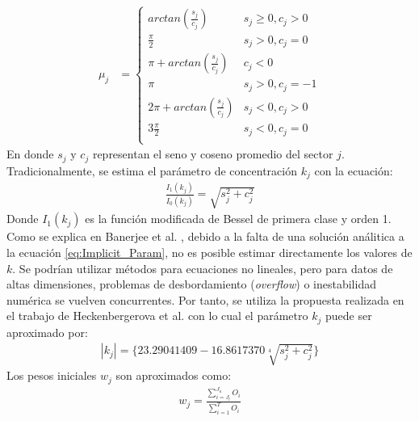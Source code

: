 \begin{align}\label{eq:Prevailing_Param}
    \mu_j &= 
        \left\{
            \begin{array}{ll}
                arctan(\frac{s_j}{c_j})  & s_j \geq 0, c_j > 0\\
                \frac{\pi}{2} & s_j > 0, c_j = 0\\
                \pi + arctan(\frac{s_j}{c_j}) & c_j < 0\\
                \pi & s_j > 0, c_j = -1\\
                2\pi + arctan(\frac{s_j}{c_j}) & s_j < 0, c_j > 0\\
                3\frac{\pi}{2} & s_j < 0, c_j = 0\\
            \end{array}
        \right.
\end{align}
En donde $s_j$ y $c_j$ representan el seno y coseno promedio del sector $j$.\\
Tradicionalmente, se estima el parámetro de concentración $k_j$ con la ecuación:
\begin{align}\label{eq:Implicit_Param}
    \frac{I_1(k_j)}{I_0(k_j)} = \sqrt{s_j^2 + c_j^2}
\end{align}
Donde $I_1(k_j)$ es la función modificada de Bessel de primera clase y orden 1.
 Como se explica en Banerjee et al. \cite{Banerjee05}, debido a la falta de una solución análitica a la ecuación \ref{eq:Implicit_Param}, no es posible estimar directamente los valores de $k$. Se podrían utilizar métodos para ecuaciones no lineales, pero para datos de altas dimensiones, problemas de desbordamiento (\emph{overflow}) o inestabilidad numérica se vuelven concurrentes. Por tanto, se utiliza la propuesta realizada en el trabajo de Heckenbergerova et al. \cite{Heckenbergerova15} con lo cual el parámetro $k_j$ puede ser aproximado por:\\
\begin{align}
    |k_j| = \{23.29041409 - 16.8617370\sqrt[4]{s_j^2 + c_j^2}\} 
\end{align}
Los pesos iniciales $w_j$ son aproximados como: \\
\begin{align}\label{eq:Weight_Param}
    w_j = \frac{\sum_{i=J_l}^{J_u} O_i}{\sum_{i=1}^{T} O_i}
\end{align}

